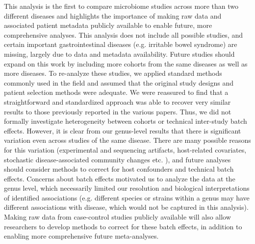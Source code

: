 \documentclass{article}
\begin{document}
This analysis is the first to compare microbiome studies across more than two different diseases and highlights the importance of making raw data and associated patient metadata publicly available to enable future, more comprehensive analyses.
This analysis does not include all possible studies, and certain important gastrointestinal diseases (e.g. irritable bowel syndrome) are missing, largely due to data and metadata availability.
Future studies should expand on this work by including more cohorts from the same diseases as well as more diseases.
To re-analyze these studies, we applied standard methods commonly used in the field and assumed that the original study designs and patient selection methods were adequate. 
We were reassured to find that a straightforward and standardized approach was able to recover very similar results to those previously reported in the various papers.
Thus, we did not formally investigate heterogeneity between cohorts or technical inter-study batch effects.
However, it is clear from our genus-level results that there is significant variation even across studies of the same disease. 
There are many possible reasons for this variation (experimental and sequencing artifacts, host-related covariates, stochastic disease-associated community changes etc. \cite{ zaneveld2017karenina,Falony2016variation, David2014lifestyle}), and future analyses should consider methods to correct for host confounders and technical batch effects.
Concerns about batch effects motivated us to analyze the data at the genus level, which necessarily limited our resolution and biological interpretations of identified associations (e.g. different species or strains within a genus may have different associations with disease, which would not be captured in this analysis).
Making raw data from case-control studies publicly available will also allow researchers to develop methods to correct for these batch effects, in addition to enabling more comprehensive future meta-analyses.
\end{document}
